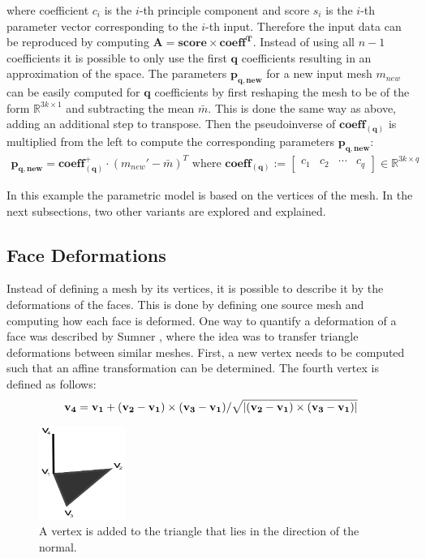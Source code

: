 where coefficient $c_i$ is the $i$-th principle component and score $s_i$ is the $i$-th parameter vector corresponding to the $i$-th input. Therefore the input data can be reproduced by computing $\mathbf{A = score \times {coeff}^T}$. Instead of using all $n-1$ coefficients it is possible to only use the first $\mathbf{q}$ coefficients resulting in an approximation of the space. The parameters $\mathbf{p_{q,new}}$ for a new input mesh $m_{new}$ can be easily computed for $\mathbf{q}$ coefficients by first reshaping the mesh to be of the form $\mathbb{R}^{3k \times 1}$ and subtracting the mean $\bar{m}$. This is done the same way as above, adding an additional step to transpose. Then the pseudoinverse of $\mathbf{coeff_{(q)}}$ is multiplied from the left to compute the corresponding parameters $\mathbf{p_{q,new}}$:
\begin{gather}
\mathbf{p_{q,new}} = \mathbf{coeff^+_{(q)}} \cdot (m_{new}' - \bar{m})^T  \text{  where }
\mathbf{coeff_{(q)}} :=
\begin{bmatrix}
 c_1&c_2&\cdots&c_{q}
\end{bmatrix}
\in \mathbb{R}^{3k \times q}
\end{gather}

In this example the parametric model is based on the vertices of the mesh. In the next subsections, two other variants are explored and explained.
\subsection{Face Deformations}
Instead of defining a mesh by its vertices, it is possible to describe it by the deformations of the faces. This is done by defining one source mesh and computing how each face is deformed. One way to quantify a deformation of a face was described by Sumner \cite{sumner2004deformation}, where the idea was to transfer triangle deformations between similar meshes. First, a new vertex needs to be computed such that an affine transformation can be determined. The fourth vertex is defined as follows:
\begin{gather}
  \mathbf{v_4} = \mathbf{v_1} + (\mathbf{v_2} - \mathbf{v_1})\times(\mathbf{v_3}-\mathbf{v_1})/\sqrt{\lvert(\mathbf{v_2}-\mathbf{v_1})\times(\mathbf{v_3}-\mathbf{v_1})\rvert} \label{normalequation}
\end{gather}
\begin{figure}[h]
\centering
\includegraphics[width=0.25\textwidth]{figures/normal}
\caption{A vertex is added to the triangle that lies in the direction of the normal.}
\label{fig:normal}
\end{figure}

